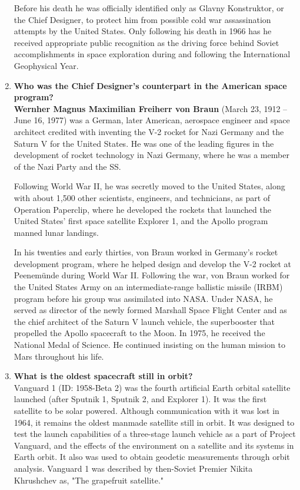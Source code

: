 \begin{enumerate}
Before his death he was officially identified only as Glavny Konstruktor, or the Chief Designer, to protect him from possible cold war assassination attempts by the United States. Only following his death in 1966 has he received appropriate public recognition as the driving force behind Soviet accomplishments in space exploration during and following the International Geophysical Year. \cite{korolev}
	
	\item {\bf Who was the Chief Designer’s counterpart in the American space program?}\\
	
{\bf Wernher Magnus Maximilian Freiherr von Braun} (March 23, 1912 – June 16, 1977) was a German, later American, aerospace engineer and space architect credited with inventing the V-2 rocket for Nazi Germany and the Saturn V for the United States. He was one of the leading figures in the development of rocket technology in Nazi Germany, where he was a member of the Nazi Party and the SS.

Following World War II, he was secretly moved to the United States, along with about 1,500 other scientists, engineers, and technicians, as part of Operation Paperclip, where he developed the rockets that launched the United States' first space satellite Explorer 1, and the Apollo program manned lunar landings.

In his twenties and early thirties, von Braun worked in Germany's rocket development program, where he helped design and develop the V-2 rocket at Peenemünde during World War II. Following the war, von Braun worked for the United States Army on an intermediate-range ballistic missile (IRBM) program before his group was assimilated into NASA. Under NASA, he served as director of the newly formed Marshall Space Flight Center and as the chief architect of the Saturn V launch vehicle, the superbooster that propelled the Apollo spacecraft to the Moon. In 1975, he received the National Medal of Science. He continued insisting on the human mission to Mars throughout his life. \cite{vonbraun}
	
	\item {\bf What is the oldest spacecraft still in orbit?}\\
	
Vanguard 1 (ID: 1958-Beta 2) was the fourth artificial Earth orbital satellite launched (after Sputnik 1, Sputnik 2, and Explorer 1). It was the first satellite to be solar powered. Although communication with it was lost in 1964, it remains the oldest manmade satellite still in orbit. It was designed to test the launch capabilities of a three-stage launch vehicle as a part of Project Vanguard, and the effects of the environment on a satellite and its systems in Earth orbit. It also was used to obtain geodetic measurements through orbit analysis. Vanguard 1 was described by then-Soviet Premier Nikita Khrushchev as, "The grapefruit satellite." \cite{vanguard1}
	

\end{enumerate}
